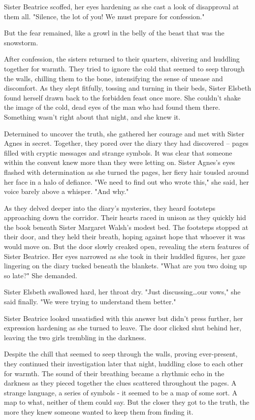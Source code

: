 \documentclass[11pt]{article}
\begin{document}
Sister Beatrice scoffed, her eyes hardening as she cast a look of disapproval  at them all. "Silence, the lot of you! We must prepare for confession."

But the fear remained, like a growl in the belly of the beast that was the snowstorm.

After confession, the sisters returned to their quarters, shivering and huddling together for warmth. They tried to ignore the cold that seemed to seep through the walls, chilling them to the bone, intensifying the sense of unease and discomfort. As they slept fitfully, tossing and turning in their beds, Sister Elsbeth found herself drawn back to the forbidden feast once more. She couldn't shake the image of the cold, dead eyes of the man who had found them there. Something wasn't right about that night, and she knew it.

Determined to uncover the truth, she gathered her courage and met with Sister Agnes in secret. Together, they pored over the diary they had discovered – pages filled with cryptic messages and strange symbols. It was clear that someone within the convent knew more than they were letting on. Sister Agnes's eyes flashed with determination as she turned the pages, her fiery hair tousled around her face in a halo of defiance. "We need to find out who wrote this," she said, her voice barely above a whisper. "And why."

As they delved deeper into the diary's mysteries, they heard footsteps approaching down the corridor. Their hearts raced in unison as they quickly hid the book beneath Sister Margaret Walsh's modest bed. The footsteps stopped at their door, and they held their breath, hoping against hope that whoever it was would move on. But the door slowly creaked open, revealing the stern features of Sister Beatrice. Her  eyes narrowed as she took in their huddled figures, her gaze lingering on the diary tucked beneath the blankets. "What are you two doing up so late?" She demanded.

Sister Elsbeth swallowed hard, her throat dry. "Just discussing\ldots{}our vows," she said finally. "We were trying to understand them better."

Sister Beatrice looked unsatisfied with this answer but didn't press further, her expression hardening as she turned to leave. The door clicked shut behind her, leaving the two girls trembling in the darkness.

Despite the chill that seemed to seep through the walls, proving ever-present, they continued their investigation later that night, huddling close to each other for warmth. The sound of their breathing became a rhythmic echo in the darkness as they pieced together the clues scattered throughout the pages. A strange language, a series of symbols - it seemed to be a map of some sort. A map to what, neither of them could say. But the closer they got to the truth, the more they knew someone wanted to keep them from finding it.
\end{document}
